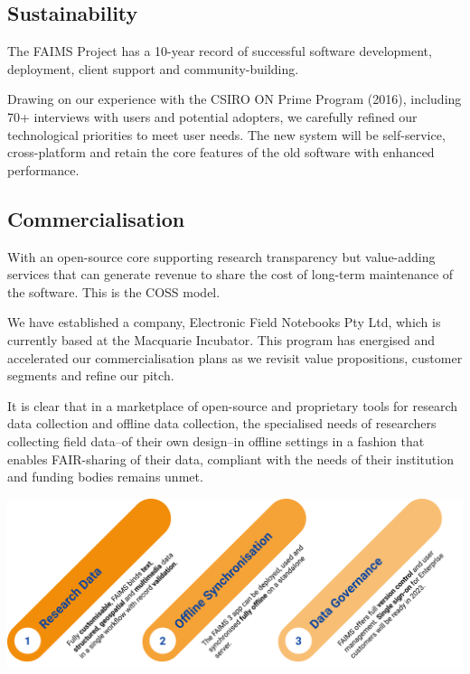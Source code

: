 \documentclass[a0,portrait]{a0poster}
\begin{document}
\begin{multicols}{3}



\section*{Sustainability}
    

The FAIMS Project has a 10-year record of successful software development, deployment, client support and community-building. 

Drawing on our experience with the CSIRO ON Prime Program (2016), including 70+ interviews with users and potential adopters, we carefully refined our technological priorities to meet user needs. The new system will be self-service, cross-platform and retain the core features of the old software with enhanced performance. 

\subsection*{Commercialisation}

With an open-source core supporting research transparency but value-adding services that can generate revenue to share the cost of long-term maintenance of the software. This is the COSS model.

We have established a company, Electronic Field Notebooks Pty Ltd, which is currently based at the Macquarie Incubator. This program has energised and accelerated our commercialisation plans as we revisit value propositions, customer segments and refine our pitch.

It is clear that in a marketplace of open-source and proprietary tools for research data collection and offline data collection, the specialised needs of researchers collecting field data--of their own design--in offline settings in a fashion that enables FAIR-sharing of their data, compliant with the needs of their institution and funding bodies remains unmet. 
\vspace{1cm}
\begin{center}
\includegraphics[width=\linewidth]{figures/marketing-materials.png}


\end{center}
\end{multicols}
\end{document}
